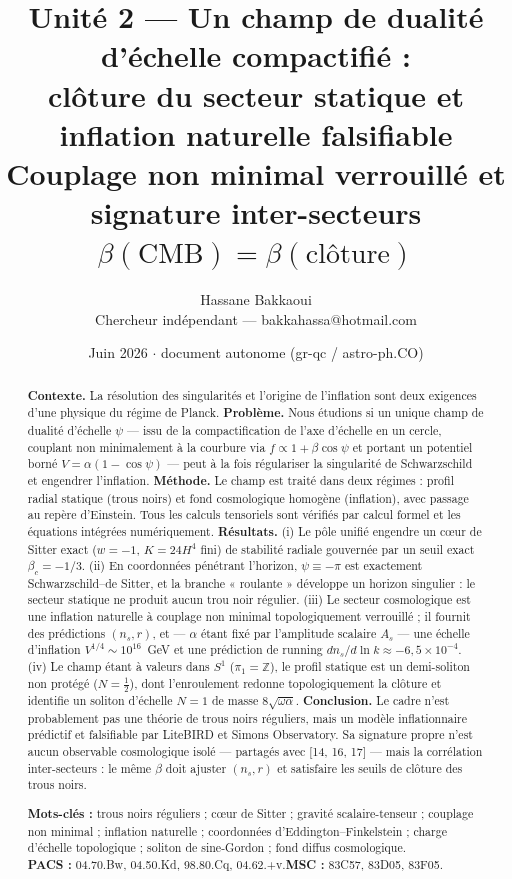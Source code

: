 \documentclass[11pt,a4paper]{article}
\title{\vspace{-1.0cm}\textbf{Unit\'e 2 --- Un champ de dualit\'e d'\'echelle compactifi\'e :\\
cl\^oture du secteur statique et inflation naturelle falsifiable}\\[5pt]
\large Couplage non minimal verrouill\'e et signature inter-secteurs $\beta(\mathrm{CMB})=\beta(\text{cl\^oture})$}
\author{Hassane Bakkaoui\\ \small Chercheur ind\'ependant --- bakkahassa@hotmail.com}
\date{\small Juin 2026 $\cdot$ document autonome (gr-qc / astro-ph.CO)}
\theoremstyle{plain}
\theoremstyle{remark}
\begin{document}
\maketitle

\begin{abstract}
\noindent
\textbf{Contexte.} La r\'esolution des singularit\'es et l'origine de l'inflation sont
deux exigences d'une physique du r\'egime de Planck. \textbf{Probl\`eme.} Nous \'etudions
si un unique champ de dualit\'e d'\'echelle $\psi$ --- issu de la compactification de
l'axe d'\'echelle en un cercle, couplant non minimalement \`a la courbure via
$f\propto1+\beta\cos\psi$ et portant un potentiel born\'e $V=\alpha(1-\cos\psi)$ ---
peut \`a la fois r\'egulariser la singularit\'e de Schwarzschild et engendrer l'inflation.
\textbf{M\'ethode.} Le champ est trait\'e dans deux r\'egimes : profil radial statique
(trous noirs) et fond cosmologique homog\`ene (inflation), avec passage au repère
d'Einstein. Tous les calculs tensoriels sont v\'erifi\'es par calcul formel et les
\'equations int\'egr\'ees num\'eriquement. \textbf{R\'esultats.} (i) Le p\^ole unifi\'e
engendre un c\oe ur de Sitter exact ($w=-1$, $K=24H^4$ fini) de stabilit\'e radiale
gouvern\'ee par un seuil exact $\beta_c=-1/3$. (ii) En coordonn\'ees p\'en\'etrant
l'horizon, $\psi\equiv-\pi$ est exactement Schwarzschild--de Sitter, et la branche
« roulante » d\'eveloppe un horizon singulier : le secteur statique ne produit aucun
trou noir r\'egulier. (iii) Le secteur cosmologique est une inflation naturelle \`a
couplage non minimal topologiquement verrouill\'e ; il fournit des pr\'edictions
$(n_s,r)$, et --- $\alpha$ \'etant fix\'e par l'amplitude scalaire $A_s$ --- une \'echelle
d'inflation $V^{1/4}\sim10^{16}$~GeV et une pr\'ediction de running
$dn_s/d\ln k\approx-6{,}5\times10^{-4}$. (iv) Le champ \'etant \`a valeurs dans $S^1$
($\pi_1=\mathbb{Z}$), le profil statique est un demi-soliton non prot\'eg\'e ($N=\tfrac12$),
dont l'enroulement redonne topologiquement la cl\^oture et identifie un soliton
d'\'echelle $N=1$ de masse $8\sqrt{\omega\alpha}$. \textbf{Conclusion.} Le cadre n'est
probablement pas une th\'eorie de trous noirs r\'eguliers, mais un mod\`ele inflationnaire
pr\'edictif et falsifiable par LiteBIRD et Simons Observatory. Sa signature propre n'est
aucun observable cosmologique isol\'e --- partag\'es avec [14, 16, 17] --- mais la
corr\'elation inter-secteurs : le m\^eme $\beta$ doit ajuster $(n_s,r)$ et satisfaire les
seuils de cl\^oture des trous noirs.

\smallskip\noindent\textbf{Mots-cl\'es :} trous noirs r\'eguliers ; c\oe ur de Sitter ;
gravit\'e scalaire-tenseur ; couplage non minimal ; inflation naturelle ;
coordonn\'ees d'Eddington--Finkelstein ; charge d'\'echelle topologique ; soliton de
sine-Gordon ; fond diffus cosmologique.\\
\textbf{PACS :} 04.70.Bw, 04.50.Kd, 98.80.Cq, 04.62.+v.\quad\textbf{MSC :} 83C57, 83D05, 83F05.


\end{abstract}
\end{document}
